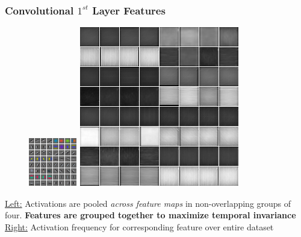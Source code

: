 \documentclass{beamer}
\begin{document}
\begin{frame}
\frametitle{Convolutional $1^{st}$ Layer Features}
\begin{center} 
\begin{figure} 
\includegraphics[scale=1.5]{./Figures/Project1/filters_slow.png} \hspace{0.5cm} 
\includegraphics[scale=0.45]{./Figures/Project1/act_large_slow.png}
\end{figure} 
\end{center} 
\underline{Left:} Activations are pooled \emph{across feature maps} in non-overlapping groups of four. \textbf{Features are grouped together to maximize temporal invariance} \\
\underline{Right:} Activation frequency for corresponding feature over entire dataset
\end{frame} 
\end{document}
